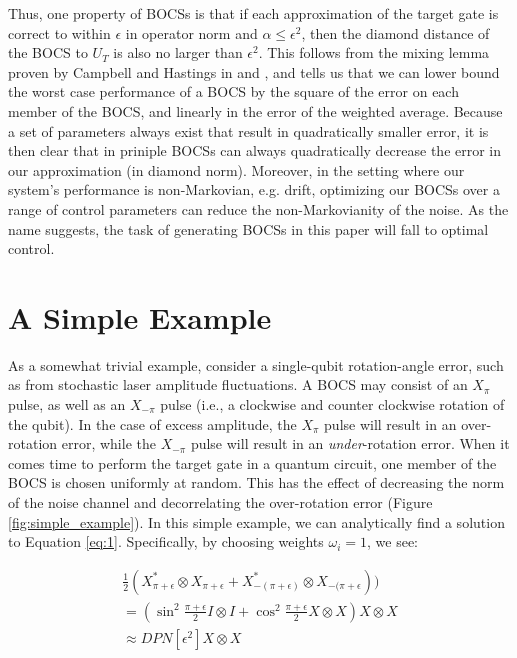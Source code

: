 \documentclass[aps,nofootinbib,pra,notitlepage,twocolumn]{revtex4-1}
\begin{document}
Thus, one property of BOCSs is that if each approximation of the target gate is correct to within $\epsilon$ in operator norm and $\alpha\leq\epsilon^2$, then the diamond distance of the BOCS to $U_T$ is also no larger than $\epsilon^2$. This follows from the mixing lemma proven by Campbell and Hastings in \cite{Campbell2017} and \cite{1612.01011}, and tells us that we can lower bound the worst case performance of a BOCS by the square of the error on each member of the BOCS, and linearly in the error of the weighted average. Because a set of parameters always exist that result in quadratically smaller error, it is then clear that in priniple BOCSs can always quadratically decrease the error in our approximation (in diamond norm). Moreover, in the setting where our system's performance is non-Markovian, e.g. drift, optimizing our BOCSs over a range of control parameters can reduce the non-Markovianity of the noise. As the name suggests, the task of generating BOCSs in this paper will fall to optimal control. 

\section{A Simple Example}
As a somewhat trivial example, consider a single-qubit rotation-angle error, such as from stochastic laser amplitude fluctuations. A BOCS may consist of an $X_\pi$ pulse, as well as an $X_{-\pi}$ pulse (i.e., a clockwise and counter clockwise rotation of the qubit). In the case of excess amplitude, the $X_\pi$ pulse will result in an over-rotation error, while the $X_{-\pi}$ pulse will result in an \emph{under}-rotation error. When it comes time to perform the target gate in a quantum circuit, one member of the BOCS is chosen uniformly at random. This has the effect of decreasing the norm of the noise channel and decorrelating the over-rotation error (Figure \ref{fig:simple_example}). In this simple example, we can analytically find a solution to Equation \ref{eq:1}. Specifically, by choosing weights $\omega_i=1$, we see:

\begin{equation}
  \begin{gathered}
    \frac{1}{2}(X^*_{\pi + \epsilon}\otimes X_{\pi + \epsilon} + X^*_{-(\pi + \epsilon)}\otimes X_{-(\pi + \epsilon})) \\
    = (\sin^2{\frac{\pi + \epsilon}{2}}I\otimes I + \cos^2{\frac{\pi + \epsilon}{2}}X\otimes X)X\otimes X \\
    \approx DPN[\epsilon^2]X\otimes X
  \end{gathered}
\end{equation}
\end{document}
